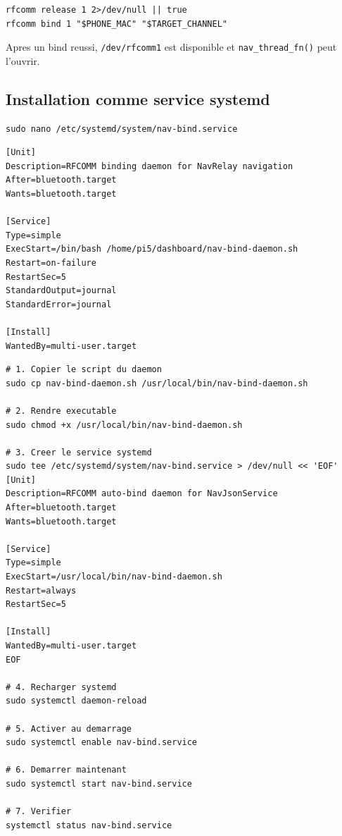 \documentclass[a4paper,11pt]{article}
\begin{document}
\begin{lstlisting}[style=bashcode]
rfcomm release 1 2>/dev/null || true
rfcomm bind 1 "$PHONE_MAC" "$TARGET_CHANNEL"
\end{lstlisting}

Apres un bind reussi, \texttt{/dev/rfcomm1} est disponible et
\texttt{nav\_thread\_fn()} peut l'ouvrir.

\subsection{Installation comme service systemd}

\begin{lstlisting}[style=bashcode]
sudo nano /etc/systemd/system/nav-bind.service
\end{lstlisting}

\begin{lstlisting}[style=confcode,caption={/etc/systemd/system/nav-bind.service}]
[Unit]
Description=RFCOMM binding daemon for NavRelay navigation
After=bluetooth.target
Wants=bluetooth.target

[Service]
Type=simple
ExecStart=/bin/bash /home/pi5/dashboard/nav-bind-daemon.sh
Restart=on-failure
RestartSec=5
StandardOutput=journal
StandardError=journal

[Install]
WantedBy=multi-user.target
\end{lstlisting}

\begin{lstlisting}[style=bashcode]
# 1. Copier le script du daemon
sudo cp nav-bind-daemon.sh /usr/local/bin/nav-bind-daemon.sh

# 2. Rendre executable
sudo chmod +x /usr/local/bin/nav-bind-daemon.sh

# 3. Creer le service systemd
sudo tee /etc/systemd/system/nav-bind.service > /dev/null << 'EOF'
[Unit]
Description=RFCOMM auto-bind daemon for NavJsonService
After=bluetooth.target
Wants=bluetooth.target

[Service]
Type=simple
ExecStart=/usr/local/bin/nav-bind-daemon.sh
Restart=always
RestartSec=5

[Install]
WantedBy=multi-user.target
EOF

# 4. Recharger systemd
sudo systemctl daemon-reload

# 5. Activer au demarrage
sudo systemctl enable nav-bind.service

# 6. Demarrer maintenant
sudo systemctl start nav-bind.service

# 7. Verifier
systemctl status nav-bind.service
\end{lstlisting}
\end{document}

